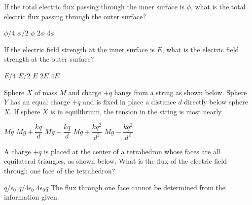\documentclass[12pt]{../oss-classkick-exam}
\begin{document}
\begin{questions}
  \question If the total electric flux passing through the inner surface is
  $\phi$, what is the total electric flux passing through the outer surface?
  \begin{choices}
    \choice $\phi/4$
    \choice $\phi/2$
    \choice $\phi$
    \choice $2\phi$
    \choice $4\phi$
  \end{choices}
  \label{sphere1}
  
  \question If the electric field strength at the inner surface is $E$, what is
  the electric field strength at the outer surface?
  \begin{choices}
    \choice $E/4$
    \choice $E/2$
    \choice $E$
    \choice $2E$
    \choice $4E$
  \end{choices}
  \label{sphere2}
  
  \uplevel{\rule{\linewidth}{.5pt}}
  
  \question Sphere $X$ of mass $M$ and charge $+q$ hangs from a string as shown
  below. Sphere $Y$ has an equal charge $+q$ and is fixed in place a distance
  $d$ directly below sphere $X$. If sphere $X$ is in equilibrium, the tension
  in the string is most nearly

  \begin{minipage}{.35\linewidth}
  \end{minipage}
  \begin{minipage}{.5\linewidth}
    \begin{choices}
      \choice$Mg$
      \choice$Mg+\dfrac{kq}d$
      \choice$Mg-\dfrac{kq}d$
      \choice$Mg+\dfrac{kq^2}{d^2}$
      \choice$Mg-\dfrac{kq^2}{d^2}$
    \end{choices}
  \end{minipage}

  \uplevel{\rule{\linewidth}{.5pt}}
  
  \question A charge $+q$ is placed at the center of a tetrahedron whose faces
  are all equilateral triangles, as shown below. What is the flux of the
  electric field through one face of the tetrahedron?

  \begin{minipage}{.3\linewidth}
  \end{minipage}
  \begin{minipage}{.69\linewidth}
    \begin{choices}
      \choice$q/\epsilon_0$
      \choice$q/4\epsilon_0$
      \choice$4\epsilon_0q$
      \choice The flux through one face cannot be determined from the
      information given.
    \end{choices}
  \end{minipage}
  \newpage
  

\end{questions}
\end{document}
